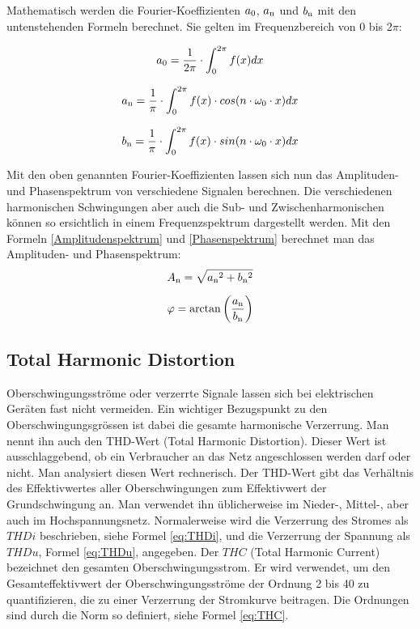 Mathematisch werden die Fourier-Koeffizienten $a\textsubscript{0}$, $a\textsubscript{n}$ und $b\textsubscript{n}$ mit den untenstehenden Formeln berechnet. Sie gelten im Frequenzbereich von 0 bis 2$\pi$: 

\begin{equation}\label{a0}
a\textsubscript{0} =  {\frac{1}{2\pi} \cdot \int_{0}^{2\pi} f(x) dx}
\end{equation}

\begin{equation}\label{an}
a\textsubscript{n} =  {\frac{1}{\pi} \cdot \int_{0}^{2\pi} f(x) \cdot cos(n \cdot \omega_0 \cdot x) dx}
\end{equation}

\begin{equation}\label{bn}
b\textsubscript{n} =  {\frac{1}{\pi} \cdot \int_{0}^{2\pi} f(x) \cdot sin(n \cdot \omega_0 \cdot x) dx}
\end{equation}

Mit den oben genannten Fourier-Koeffizienten lassen sich nun das Amplituden- und Phasenspektrum von verschiedene Signalen berechnen. Die verschiedenen harmonischen Schwingungen aber auch die Sub- und Zwischenharmonischen können so ersichtlich in einem Frequenzspektrum dargestellt werden. Mit den Formeln \ref{Amplitudenspektrum} und \ref{Phasenspektrum} berechnet man das Amplituden- und Phasenspektrum:
\begin{equation}\label{Amplitudenspektrum}
A\textsubscript{n} = {\sqrt{a\textsubscript{n}^2+b\textsubscript{n}^2}}
\end{equation}

\begin{equation}\label{Phasenspektrum}
\varphi = \arctan\left( \frac{a\textsubscript{n}}{b\textsubscript{n}}\right) 
\end{equation}



\subsection{Total Harmonic Distortion}
Oberschwingungsströme oder verzerrte Signale lassen sich bei elektrischen Geräten fast nicht vermeiden. Ein wichtiger Bezugspunkt zu den Oberschwingungsgrössen ist dabei die gesamte harmonische Verzerrung. Man nennt ihn auch den THD-Wert (Total Harmonic Distortion). Dieser Wert ist ausschlaggebend, ob ein Verbraucher an das Netz angeschlossen werden darf oder nicht. Man analysiert diesen Wert rechnerisch. Der THD-Wert gibt das Verhältnis des Effektivwertes aller Oberschwingungen zum Effektivwert der Grundschwingung an. Man verwendet ihn üblicherweise im Nieder-, Mittel-, aber auch im Hochspannungsnetz. Normalerweise wird die Verzerrung des Stromes als $THDi$ beschrieben, siehe Formel \ref{eq:THDi}, und die Verzerrung der Spannung als $THDu$, Formel \ref{eq:THDu}, angegeben. Der $THC$ (Total Harmonic Current) bezeichnet den gesamten Oberschwingungsstrom. Er wird verwendet, um den Gesamteffektivwert der Oberschwingungsströme der Ordnung 2 bis 40 zu quantifizieren, die zu einer Verzerrung der Stromkurve beitragen. Die Ordnungen sind durch die Norm so definiert, siehe Formel \ref{eq:THC}. 

